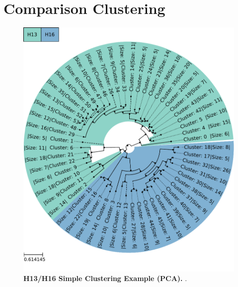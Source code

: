 \section{Comparison Clustering} \label{sec:Comparison_Clustering}

\blindtext

\begin{figure}[!hbt]
    \centering
    \includegraphics[width=\textwidth]{PCA/Clustertree_Segment_4_H_Simple.pdf}
    \caption[H13/H16 Simple Clustering Example (\Acrshort{PCA})]{\textbf{H13/H16 Simple Clustering Example (\Acrshort{PCA}).} .}
    \label{fig:Simple_Clustertree_PCA}
\end{figure}

